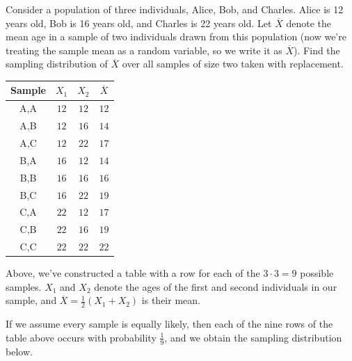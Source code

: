 \begin{example}\label{DistOfMeanAge} Consider a population of three individuals, Alice, Bob, and Charles. Alice is 12 years old, Bob is 16 years old, and Charles is 22 years old. Let $\overline{X}$ denote the mean age in a sample of two individuals drawn from this population (now we're treating the sample mean as a random variable, so we write it as $\overline{X}$). Find the sampling distribution of $\overline{X}$ over all samples of size two taken with replacement.

\begin{center}
\begin{tabular}{c|c|c|c}
Sample & $X_1$ & $X_2$ & $\overline{X}$ \\
\hline
A,A & $12$ & $12$ & $12$ \\
A,B & $12$ & $16$ & $14$ \\
A,C & $12$ & $22$ & $17$ \\
B,A & $16$ & $12$ & $14$ \\
B,B & $16$ & $16$ & $16$ \\
B,C & $16$ & $22$ & $19$ \\
C,A & $22$ & $12$ & $17$ \\
C,B & $22$ & $16$ & $19$ \\
C,C & $22$ & $22$ & $22$ \\
\end{tabular}
\end{center}

\noindent Above, we've constructed a table with a row for each of the $3\cdot3 = 9$ possible samples. $X_1$ and $X_2$ denote the ages of the first and second individuals in our sample, and $\overline{X} = \frac{1}{2}(X_1 + X_2)$ is their mean.

\noindent If we assume every sample is equally likely, then each of the nine rows of the table above occurs with probability $\frac{1}{9}$, and we obtain the sampling distribution below.


\end{example}
